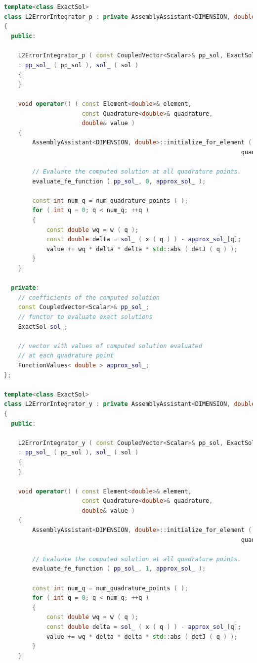 \documentclass[a4paper, 11pt, twoside]{article}
\begin{document}
\begin{lstlisting}[language=C++, basicstyle={\footnotesize, \ttfamily}, keywordstyle=\color{blue}, numbers=none, tabsize=4]
template<class ExactSol>
class L2ErrorIntegrator_p : private AssemblyAssistant<DIMENSION, double>
{
  public:

    L2ErrorIntegrator_p ( const CoupledVector<Scalar>& pp_sol, ExactSol& sol )
    : pp_sol_ ( pp_sol ), sol_ ( sol )
    {
    }

    void operator() ( const Element<double>& element, 
                      const Quadrature<double>& quadrature,
                      double& value )
    {
        AssemblyAssistant<DIMENSION, double>::initialize_for_element ( element, 
                                                                   quadrature );

        // Evaluate the computed solution at all quadrature points.
        evaluate_fe_function ( pp_sol_, 0, approx_sol_ );

        const int num_q = num_quadrature_points ( );
        for ( int q = 0; q < num_q; ++q )
        {
            const double wq = w ( q );
            const double delta = sol_ ( x ( q ) ) - approx_sol_[q];
            value += wq * delta * delta * std::abs ( detJ ( q ) );
        }
    }

  private:
    // coefficients of the computed solution
    const CoupledVector<Scalar>& pp_sol_;
    // functor to evaluate exact solutions
    ExactSol sol_;

    // vector with values of computed solution evaluated 
    // at each quadrature point
    FunctionValues< double > approx_sol_;
};

template<class ExactSol>
class L2ErrorIntegrator_y : private AssemblyAssistant<DIMENSION, double>
{
  public:

    L2ErrorIntegrator_y ( const CoupledVector<Scalar>& pp_sol, ExactSol& sol )
    : pp_sol_ ( pp_sol ), sol_ ( sol )
    {
    }

    void operator() ( const Element<double>& element, 
                      const Quadrature<double>& quadrature,
                      double& value )
    {
        AssemblyAssistant<DIMENSION, double>::initialize_for_element ( element, 
                                                                   quadrature );

        // Evaluate the computed solution at all quadrature points.
        evaluate_fe_function ( pp_sol_, 1, approx_sol_ );

        const int num_q = num_quadrature_points ( );
        for ( int q = 0; q < num_q; ++q )
        {
            const double wq = w ( q );
            const double delta = sol_ ( x ( q ) ) - approx_sol_[q];
            value += wq * delta * delta * std::abs ( detJ ( q ) );
        }
    }


\end{lstlisting}
\end{document}
